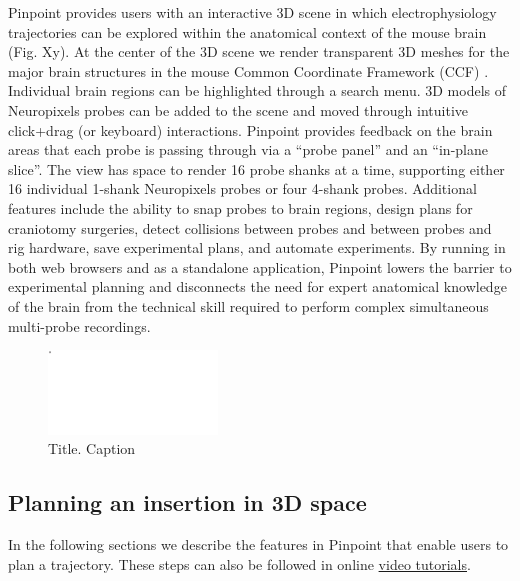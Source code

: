 
Pinpoint provides users with an interactive 3D scene in which electrophysiology trajectories can be explored within the anatomical context of the mouse brain (Fig. Xy). At the center of the 3D scene we render transparent 3D meshes for the major brain structures in the mouse Common Coordinate Framework (CCF) \citep{wang2020allen}. Individual brain regions can be highlighted through a search menu. 3D models of Neuropixels probes \citep{jun2017fully} can be added to the scene and moved through intuitive click+drag (or keyboard) interactions. Pinpoint provides feedback on the brain areas that each probe is passing through via a ``probe panel'' and an ``in-plane slice''. The view has space to render 16 probe shanks at a time, supporting either 16 individual 1-shank Neuropixels probes or four 4-shank probes. Additional features include the ability to snap probes to brain regions, design plans for craniotomy surgeries, detect collisions between probes and between probes and rig hardware, save experimental plans, and automate experiments. By running in both web browsers and as a standalone application, Pinpoint lowers the barrier to experimental planning and disconnects the need for expert anatomical knowledge of the brain from the technical skill required to perform complex simultaneous multi-probe recordings. 

\begin{figure}
\centering
\includegraphics[keepaspectratio,width=0.4\textwidth]{figures/figure-1.pdf}
\caption[mini-caption]{Title. Caption}
\label{fig:pinpoint_overview}
\end{figure}

\subsection{Planning an insertion in 3D space}

In the following sections we describe the features in Pinpoint that enable users to plan a trajectory. These steps can also be followed in online \href{https://virtualbrainlab.org/02_traj_planner/02_tp_tutorial.html}{video tutorials}. 

